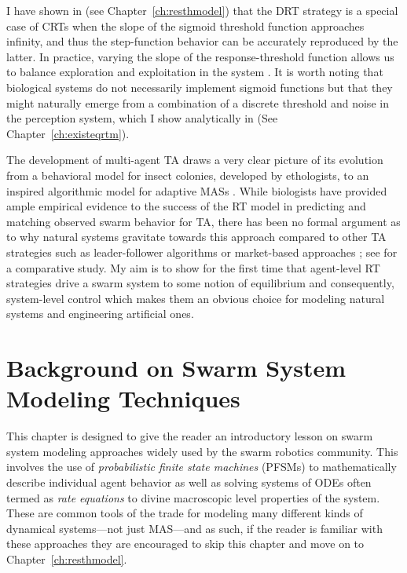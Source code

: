 \documentclass[defaultstyle,12pt]{proposal}
\begin{document}
I have shown in \cite{Kanakia2014} (see Chapter~\ref{ch:resthmodel}) that the DRT strategy is a special case of CRTs when the slope of the sigmoid threshold function approaches infinity, and thus the step-function behavior can be accurately reproduced by the latter. In practice, varying the slope of the response-threshold function allows us to balance exploration and exploitation in the system \cite{Bonabeau1997}. It is worth noting that biological systems do not necessarily implement sigmoid functions but that they might naturally emerge from a combination of a discrete threshold and noise in the perception system, which I show analytically in \cite{Kanakia2015} (See Chapter~\ref{ch:existeqrtm}). 

The development of multi-agent TA draws a very clear picture of its evolution from a behavioral model for insect colonies, developed by ethologists, to an inspired algorithmic model for adaptive MASs \cite{Krieger2000}. While biologists have provided ample empirical evidence to the success of the RT model in predicting and matching observed swarm behavior for TA, there has been no formal argument as to why natural systems gravitate towards this approach compared to other TA strategies such as leader-follower algorithms \cite{Chen2011} or market-based approaches \cite{Amstutz2008,Vig2007}; see \cite{Kalra2006} for a comparative study. My aim is to show for the first time that agent-level RT strategies drive a swarm system to some notion of equilibrium and consequently, system-level control which makes them an obvious choice for modeling natural systems and engineering artificial ones.



\chapter{Background on Swarm System Modeling Techniques}\label{ch:background}
This chapter is designed to give the reader an introductory lesson on swarm system modeling approaches widely used by the swarm robotics community. This involves the use of \emph{probabilistic finite state machines} (PFSMs) to mathematically describe individual agent behavior as well as solving systems of ODEs often termed as \emph{rate equations} to divine macroscopic level properties of the system. These are common tools of the trade for modeling many different kinds of dynamical systems---not just MAS---and as such, if the reader is familiar with these approaches they are encouraged to skip this chapter and move on to Chapter~\ref{ch:resthmodel}.
\end{document}
